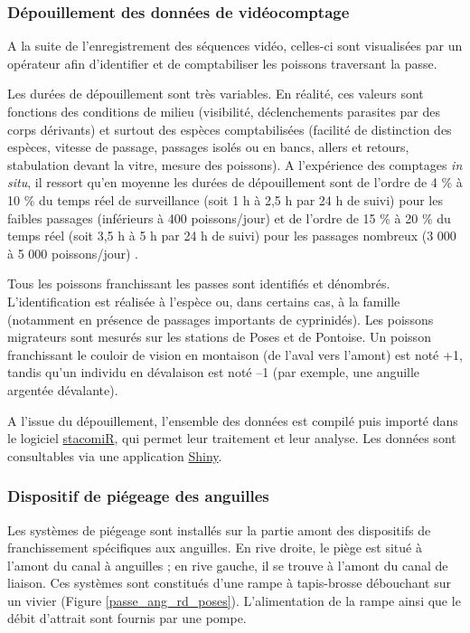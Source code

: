 \documentclass[11pt,twoside]{article}\usepackage[]{graphicx}\usepackage[table]{xcolor}
\begin{document}
\subsubsection{Dépouillement des données de vidéocomptage}

A la suite de l'enregistrement des séquences vidéo, celles-ci sont visualisées par un opérateur afin d'identifier et de comptabiliser les poissons traversant la passe.

Les durées de dépouillement sont très variables. En réalité, ces valeurs sont fonctions des conditions de milieu (visibilité, déclenchements parasites par des corps dérivants) et surtout des espèces comptabilisées (facilité de distinction des espèces, vitesse de passage, passages isolés ou en bancs, allers et retours, stabulation devant la vitre, mesure des poissons). A l'expérience des comptages \textit{in situ}, il ressort qu'en moyenne les durées de dépouillement sont de l'ordre de 4 \% à 10 \% du temps réel de surveillance (soit 1 h à 2,5 h par 24 h de suivi) pour les faibles passages (inférieurs à 400 poissons/jour) et de l'ordre de 15 \% à 20 \% du temps réel (soit 3,5 h à 5 h par 24 h de suivi) pour les passages nombreux (3 000 à 5 000 poissons/jour) \citep{travade_les_1992}.

Tous les poissons franchissant les passes sont identifiés et dénombrés. L’identification est réalisée à l’espèce ou, dans certains cas, à la famille (notamment en présence de passages importants de cyprinidés).
Les poissons migrateurs sont mesurés sur les stations de Poses et de Pontoise. Un poisson franchissant le couloir de vision en montaison (de l’aval vers l’amont) est noté +1, tandis qu’un individu en dévalaison est noté –1 (par exemple, une anguille argentée dévalante).

A l'issue du dépouillement, l'ensemble des données est compilé puis importé dans le logiciel \href{http://stacomir.r-forge.r-project.org/}{stacomiR}, qui permet leur traitement et leur analyse. Les données sont consultables via une application \href{https://shiny.seinormigr.fr/Stacomi_App/}{Shiny}.

\subsubsection{Dispositif de piégeage des anguilles}

Les systèmes de piégeage sont installés sur la partie amont des dispositifs de franchissement spécifiques aux anguilles. En rive droite, le piège est situé à l’amont du canal à anguilles ; en rive gauche, il se trouve à l’amont du canal de liaison. Ces systèmes sont constitués d'une rampe à \og tapis-brosse \fg{} débouchant sur un vivier (Figure \ref{passe_ang_rd_poses}). L'alimentation de la rampe ainsi que le débit d'attrait sont fournis par une pompe.
\end{document}
